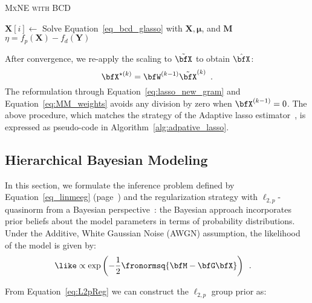 {\fontsize{4}{4}\selectfont
\begin{algorithm}[t]
\caption{\textsc{MxNE with BCD}}
\While{
		$\eta \geq \epsilon$
	  }
	  {
	  		{
	  			$\mathbf{X}[i]\leftarrow$ Solve Equation~\eqref{eq_bcd_glasso} with $\mathbf{X}, \mathbf{\mu}$, and $\mathbf{M}$
	  		}
	  	$\eta = f_p(\mathbf{X})-f_d(\mathbf{Y})$
	  }
\label{alg:mxne_bcd}
\end{algorithm}
}

After convergence, we re-apply the scaling to $\tilde{\bfX}$ to obtain $\hat{\bfX}$:
\begin{equation}
    \label{eq:MM_weights}
    \bfX^{\star(k)} = \bfW^{(k-1)} \tilde{\bfX}^{(k)} \enspace .
\end{equation}
The reformulation through Equation~\eqref{eq:lasso_new_gram} and Equation~\eqref{eq:MM_weights} avoids any division by zero when $\bfX^{(k-1)}=0$. The above procedure, which matches the strategy of the Adaptive \ac{lasso} estimator~\cite{Zou06}, is expressed as pseudo-code in Algorithm~\ref{alg:adpative_lasso}.

\subsection{Hierarchical Bayesian Modeling}
\label{section:HBM}

In this section, we formulate the inference problem defined by Equation~\eqref{eq_linmeeg} (page~\pageref{eq_linmeeg}) and the regularization strategy with $\ell_{2,p}$-quasinorm from a Bayesian perspective~\cite{KaSo05,Lu14}: the Bayesian approach incorporates prior beliefs about the model parameters in terms of probability distributions. Under the Additive, White Gaussian Noise (AWGN) assumption, the likelihood of the model is given by:
\begin{eqnarray} \label{eq:like}
\like &\propto \exp \left( - \frac{1}{2} \fronormsq{\bfM - \bfG \bfX} \right) \enspace.
\end{eqnarray}

From Equation~\eqref{eq:L2pReg} we can construct the $\ell_{2,p}$ group prior as:

